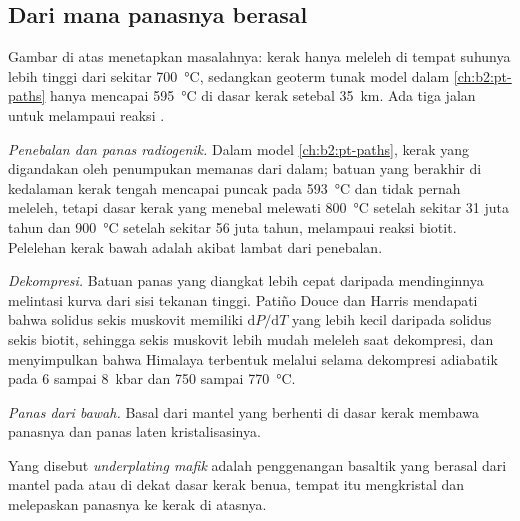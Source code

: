 \subsection*{Dari mana panasnya berasal}

Gambar di atas menetapkan masalahnya: kerak hanya meleleh di tempat suhunya lebih tinggi dari sekitar
\qty{700}{\celsius}, sedangkan geoterm tunak model dalam \cref{ch:b2:pt-paths}
hanya mencapai \qty{595}{\celsius} di dasar kerak setebal \qty{35}{km}. Ada tiga jalan
untuk melampaui reaksi .

\emph{Penebalan dan panas radiogenik.} Dalam model \cref{ch:b2:pt-paths}, kerak yang
digandakan oleh penumpukan memanas dari dalam; batuan yang berakhir di kedalaman kerak tengah mencapai puncak pada
\qty{593}{\celsius} dan tidak pernah meleleh, tetapi dasar kerak yang menebal melewati
\qty{800}{\celsius} setelah sekitar 31 juta tahun dan \qty{900}{\celsius} setelah sekitar 56 juta tahun, melampaui
reaksi biotit. Pelelehan kerak bawah adalah akibat lambat dari penebalan.

\emph{Dekompresi.} Batuan panas yang diangkat lebih cepat daripada mendinginnya melintasi
kurva  dari sisi tekanan tinggi. Patiño Douce dan Harris mendapati bahwa
solidus sekis muskovit memiliki $\mathrm{d}P/\mathrm{d}T$ yang lebih kecil daripada solidus
sekis biotit, sehingga sekis muskovit lebih mudah meleleh saat dekompresi, dan
menyimpulkan bahwa  Himalaya terbentuk melalui  
selama dekompresi adiabatik pada 6 sampai \qty{8}{kbar} dan 750 sampai \qty{770}{\celsius}.

\emph{Panas dari bawah.} Basal dari mantel yang berhenti di dasar kerak membawa
panasnya dan panas laten kristalisasinya.

\begin{definition}\label{def:b2:crustal-melting:underplating}
Yang disebut \emph{underplating mafik} adalah penggenangan  basaltik
yang berasal dari mantel pada atau di dekat dasar kerak benua, tempat  itu mengkristal dan
melepaskan panasnya ke kerak di atasnya.
\end{definition}

